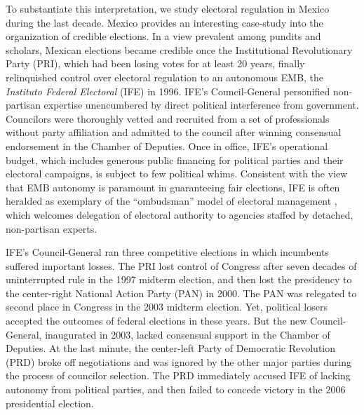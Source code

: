 \documentclass[12 pt, letter]{article}
\begin{document}
To substantiate this interpretation, we study electoral regulation in Mexico during the last decade.  Mexico provides an interesting case-study into the organization of credible elections.  In a view prevalent among pundits and scholars, Mexican elections became credible once the Institutional Revolutionary Party (PRI), which had been losing votes for at least 20 years, finally relinquished control over electoral regulation to an autonomous EMB, the \emph{Instituto Federal Electoral} (IFE) in 1996. IFE's Council-General personified non-partisan expertise unencumbered by direct political interference from government. Councilors were thoroughly vetted and recruited from a set of professionals without party affiliation and admitted to the council after winning consensual endorsement in the Chamber of Deputies. Once in office, IFE's operational budget, which includes generous public financing for political parties and their electoral campaigns, is subject to few political whims.  Consistent with the view that EMB autonomy is paramount in guaranteeing fair elections, IFE is often heralded as exemplary of the ``ombudsman'' model of electoral management \citep{Eisenstadt2004}, which welcomes delegation of electoral authority to agencies staffed by detached, non-partisan experts.

IFE's Council-General ran three competitive elections in which incumbents suffered important losses. The PRI lost control of Congress after seven decades of uninterrupted rule in the 1997 midterm election, and then lost the presidency to the center-right National Action Party (PAN) in 2000. The PAN was relegated to second place in Congress in the 2003 midterm election. Yet, political losers accepted the outcomes of federal elections in these years.  But the new Council-General, inaugurated in 2003, lacked consensual support in the Chamber of Deputies.  At the last minute, the center-left Party of Democratic Revolution (PRD) broke off negotiations and was ignored by the other major parties during the process of  councilor selection.  The PRD immediately accused IFE of lacking autonomy from political parties, and then failed to concede victory in the 2006 presidential election.  
\end{document}
